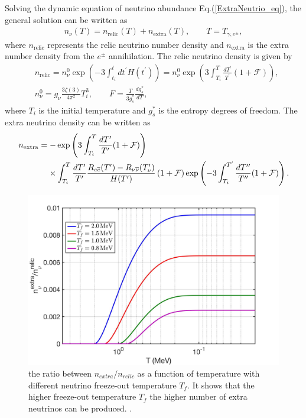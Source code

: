 Solving the dynamic equation of neutrino abundance Eq.(\ref{ExtraNeutrio_eq}), the general solution can be written as
\begin{align}
n_\nu(T)=n_\mathrm{relic}(T)+n_\mathrm{extra}(T),\qquad T=T_{\gamma,e^\pm},
\end{align}
where $n_\mathrm{relic}$ represents the relic neutrino number density and $n_\mathrm{extra}$ is the extra number density from the $e^\pm$ annihilation. The relic neutrino density is given by
\begin{align}  &n_\mathrm{relic}=n_\nu^0\exp\left(-3\int_{t_i}^t{dt^\prime}H(t^\prime)\right)=n_\nu^0\exp\left(3\int_{T_i}^T\frac{dT^\prime}{T^\prime}(1+\mathcal{F})\right),\\
&n^0_\nu=g_\nu\frac{3\zeta(3)}{4\pi^2}T^3_i,\qquad F=\frac{T}{3g^\ast_s}\frac{dg^\ast_s}{dT},
\end{align}
where $T_i$ is the initial temperature and $g^\ast_s$ is the entropy degrees of freedom. The extra neutrino density can be written as
\begin{align}
n_\mathrm{extra}=-&\exp\left(3\int_{T_i}^T\frac{dT^\prime}{T^\prime}(1+\mathcal{F})\right)\notag\\
\times&\int_{T_i}^T\frac{dT^\prime}{T^\prime}\frac{R_{e\overline{e}}(T^\prime)-R_{\nu\overline{\nu}}(T^\prime_\nu)}{H(T^\prime)}\left(1+\mathcal{F}\right)\exp\left(-3\int_{T_i}^{T^{\prime}}\frac{dT^{\prime\prime}}{T^{\prime\prime}}(1+\mathcal{F})\right).
\end{align}
\begin{figure}[ht]
\begin{center}
\includegraphics[width=0.9\linewidth]{./plots/ExtraNeutrinoRatio}
\caption{the ratio between $n_{extra}/n_{relic}$ as a function of temperature with different neutrino freeze-out temperature $T_f$. It shows that the higher freeze-out temperature $T_f$ the higher number of extra neutrinos can be produced. .}
\label{ExtraNeutrinoRatio}
\end{center}
\end{figure}

